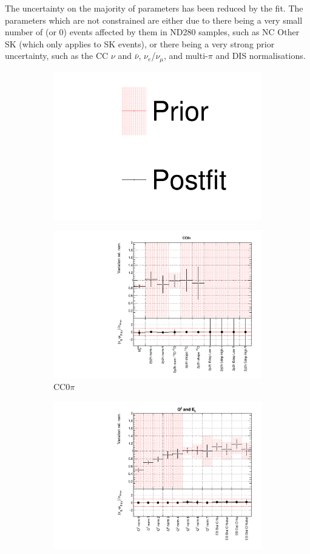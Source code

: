 The uncertainty on the majority of parameters has been reduced by the fit. The parameters which are not constrained are either due to there being a very small number of (or 0) events affected by them in ND280 samples, such as NC Other SK (which only applies to SK events), or there being a very strong prior uncertainty, such as the CC $\nu$ and $\bar{\nu}$, $\nu_e$/$\nu_{\mu}$, and multi-$\pi$ and DIS normalisations.

\begin{figure}
\centering
\begin{subfigure}{0.8\textwidth}
  \centering
  \includegraphics[width=0.25\linewidth]{figs/asmv_leg}
\end{subfigure}
\begin{subfigure}{0.49\textwidth}
  \centering
  \includegraphics[width=0.9\linewidth]{figs/asmvxsec1}
  \caption{CC0$\pi$}
\end{subfigure}
\begin{subfigure}{0.49\textwidth}
  \centering
  \includegraphics[width=0.9\linewidth]{figs/asmvxsec2}

\end{subfigure}
\end{figure}
